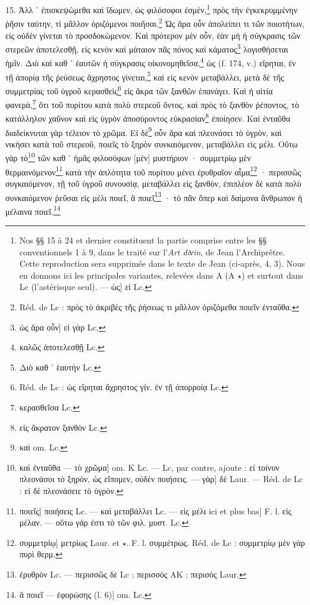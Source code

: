 \documentclass[a4paper, 11pt, oneside, polutonikogreek, french]{article}
\begin{document}
15. Ἀλλ ᾽ ἐπισκεψώμεθα καὶ ἴδωμεν, ὡς φιλόσοφοι ἐσμὲν,\footnote{Nos §§ 15 à 24 et dernier constituent la partie comprise entre les §§ conventionnels 1 à 9, dans le traité sur l'\emph{Art diνin}, de Jean l'Archiprêtre. Cette reproduction sera supprimée dans le texte de Jean (ci-après, 4, 3). Nous en donnons ici les principales variantes, relevées dans A (A $\star$) et surtout dans Lc (l'astérisque seul). --- ὡς] εἰ Lc.} πρὸς τὴν ἐγκεκρυμμένην ῥῆσιν ταύτην, τί μᾶλλον ὁριζόμενοι ποιῆσαι.\footnote{Réd. de Lc : πρὸς τὸ ἀκριβὲς τῆς ῥήσεως τι μᾶλλον ὀριζόμεθα ποιεῖν ἐνταῦθα.} Ὡς ἄρα οὖν ἀπολείπει τι τῶν ποιοτήτων, εἰς οὐδὲν γίνεται τὸ προσδοκώμενον. Καὶ πρότερον μὲν οὖν, ἐὰν μὴ ἡ σύγκρασις τῶν στερεῶν ἀποτελεσθῇ, εἰς κενὸν καὶ μάταιον πᾶς πόνος καὶ κάματος\footnote{ὡς ἄρα οὖν] εἰ γὰρ Lc.} λογισθήσεται ἡμῖν. Διὸ καὶ καθ ᾽ ἑαυτῶν ἠ σύγκρασις οἰκονομηθεῖσα,\footnote{καλῶς ἀποτελεσθῇ Lc.} ὡς (f. 174, v.) εἴρηται, ἐν τῇ ἀπορίᾳ τῆς ῥεύσεως ἄχρηστος γίνεται,\footnote{Διὸ καθ ᾽ ἑαυτὴν Lc.} καὶ εἰς κενὸν μεταβάλλει, μετὰ δὲ τῆς συμμετρίας τοῦ ὑγροῦ κερασθεὶς\footnote{Réd. de Lc : ὡς εἴρηται ἄχρηστος γίν. ἐν τῇ ἀπορροίᾳ Lc.} εἰς ἄκρα τῶν ξανθῶν ἐπανάγει. Καὶ ἠ αἰτία φανερὰ,\footnote{κερασθεῖσα Lc.} ὅτι τοῦ πυρίτου κατὰ πολὺ στερεοῦ ὄντος, καὶ πρὸς τὸ ξανθὸν ῥέποντος, τὸ κατάλληλον χαῦνον καὶ εἰς ὑγρὸν ἀποσύροντος εὐκρασίαν\footnote{εἰς ἄκρατον ξανθὸν Lc.} ἐποίησεν. Καὶ ἐνταῦθα διαδείκνυται γὰρ τέλειον τὸ χρῶμα. Εἰ δὲ\footnote{καὶ om. Lc.} οὖν ἄρα καὶ πλεονάσει τὸ ὑγρὸν, καὶ νικήσει κατὰ τοῦ στερεοῦ, ποιεῖς τὸ ξηρὸν συνκαιόμενον, μεταβάλλει εἰς μέλι. Οὕτω γὰρ τὸ\footnote{καὶ ἐνταῦθα --- τὸ χρῶμα] om. K Lc. --- Lc, par contre, ajoute : εἰ τοίνυν πλεονάσοι τὸ ξηρὸν, ὡς εἴπομεν, οὐδὲν ποιήσεις. --- γὰρ] δὲ Laur. --- Réd. de Lc : εἰ δὲ πλεονάσειε τὸ ὑγρὸν.} τῶν καθ ᾽ ἡμᾶς φιλοσόφων [μὲν] μυστήριον · συμμετρίῳ μὲν θερμαινόμενον\footnote{ποιεῖς] ποιήσεις Lc. --- καὶ μεταβάλλει Lc. --- εἰς μέλι ici et plus bas] F. l. εἰς μέλαν. --- οὕτω γάρ ἐστι τὸ τῶν φιλ. μυστ. Lc.} κατὰ τὴν ἀπλότητα τοῦ πυρίτου μένει ἐρυθραῖον αἷμα\footnote{συμμετρίῳ] μετρίως Laur. et $\star$. F. l. συμμέτρως. Réd. de Lc : συμμετρίῳ μὲν γὰρ πυρὶ θερμ.} · περισσῶς συγκαιόμενον, τῇ τοῦ ὑγροῦ συνουσίᾳ, μεταβάλλει εἰς ξανθὸν, ἐπιπλέον δὲ κατὰ πολὺ συνκαιόμενον ῥεῦσαι εἰς μέλι ποιεῖ, ἃ ποιεῖ\footnote{ἐρυθρὸν Lc. --- περισσῶς δὲ Lc ; περισσὸς AK ; περισὸς Laur.} · τὸ πᾶν ὅπερ καὶ δαίμονα ἄνθρωπον ἡ μέλαινα ποιεῖ.\footnote{ἃ ποιεῖ --- ἐφορώσης (l. 6)] om. Lc.}
\end{document}
